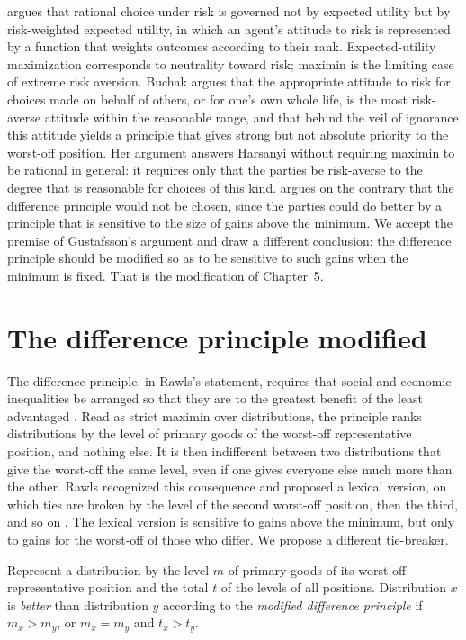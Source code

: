 \documentclass{situationist-preprint}
\begin{document}
\citet{Buchak2017} argues that rational choice under risk is governed not by expected utility but by risk-weighted expected utility, in which an agent's attitude to risk is represented by a function that weights outcomes according to their rank. Expected-utility maximization corresponds to neutrality toward risk; maximin is the limiting case of extreme risk aversion. Buchak argues that the appropriate attitude to risk for choices made on behalf of others, or for one's own whole life, is the most risk-averse attitude within the reasonable range, and that behind the veil of ignorance this attitude yields a principle that gives strong but not absolute priority to the worst-off position. Her argument answers Harsanyi without requiring maximin to be rational in general: it requires only that the parties be risk-averse to the degree that is reasonable for choices of this kind. \citet{Gustafsson2018} argues on the contrary that the difference principle would not be chosen, since the parties could do better by a principle that is sensitive to the size of gains above the minimum. We accept the premise of Gustafsson's argument and draw a different conclusion: the difference principle should be modified so as to be sensitive to such gains when the minimum is fixed. That is the modification of Chapter~5.

\section{The difference principle modified}

The difference principle, in Rawls's statement, requires that social and economic inequalities be arranged so that they are to the greatest benefit of the least advantaged \citep[\S 13]{Rawls1971}. Read as strict maximin over distributions, the principle ranks distributions by the level of primary goods of the worst-off representative position, and nothing else. It is then indifferent between two distributions that give the worst-off the same level, even if one gives everyone else much more than the other. Rawls recognized this consequence and proposed a lexical version, on which ties are broken by the level of the second worst-off position, then the third, and so on \citep[\S 13]{Rawls1971}. The lexical version is sensitive to gains above the minimum, but only to gains for the worst-off of those who differ. We propose a different tie-breaker.

\begin{definition}\label{d:mdp}
Represent a distribution by the level $m$ of primary goods of its worst-off representative position and the total $t$ of the levels of all positions. Distribution $x$ is \emph{better} than distribution $y$ according to the \emph{modified difference principle} if $m_x > m_y$, or $m_x = m_y$ and $t_x > t_y$.
\end{definition}
\end{document}

